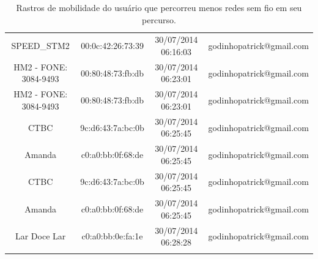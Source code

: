 \documentclass[12pt, %
openright, 
oneside,
a4paper,
brazil]{facom-ufu-abntex2}
\begin{document}
\begin{center}
\begin{longtable}{|c|c|c|c|}
SPEED\_STM2               & 00:0c:42:26:73:39 & 30/07/2014 06:16:03 & godinhopatrick@gmail.com \\
HM2 - FONE: 3084-9493     & 00:80:48:73:fb:db & 30/07/2014 06:23:01 & godinhopatrick@gmail.com \\
HM2 - FONE: 3084-9493     & 00:80:48:73:fb:db & 30/07/2014 06:23:01 & godinhopatrick@gmail.com \\
CTBC                      & 9c:d6:43:7a:bc:0b & 30/07/2014 06:25:45 & godinhopatrick@gmail.com \\
Amanda                    & c0:a0:bb:0f:68:de & 30/07/2014 06:25:45 & godinhopatrick@gmail.com \\
CTBC                      & 9c:d6:43:7a:bc:0b & 30/07/2014 06:25:45 & godinhopatrick@gmail.com \\
Amanda                    & c0:a0:bb:0f:68:de & 30/07/2014 06:25:45 & godinhopatrick@gmail.com \\
Lar Doce Lar              & c0:a0:bb:0e:fa:1e & 30/07/2014 06:28:28 & godinhopatrick@gmail.com \\

\caption{Rastros de mobilidade do usuário que percorreu menos redes sem fio em seu percurso.}
\centering
\end{longtable}
\end{center}
\end{document}
